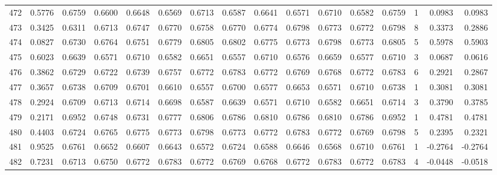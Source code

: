 \begin{tabular}{lrrrrrrrrrrrrrrr}
472 &      0.5776 &  0.6759 &  0.6600 &  0.6648 &  0.6569 &  0.6713 &  0.6587 &  0.6641 &  0.6571 &  0.6710 &   0.6582 &     0.6759 &      1 &                    0.0983 &                     0.0983 \\
473 &      0.3425 &  0.6311 &  0.6713 &  0.6747 &  0.6770 &  0.6758 &  0.6770 &  0.6774 &  0.6798 &  0.6773 &   0.6772 &     0.6798 &      8 &                    0.3373 &                     0.2886 \\
474 &      0.0827 &  0.6730 &  0.6764 &  0.6751 &  0.6779 &  0.6805 &  0.6802 &  0.6775 &  0.6773 &  0.6798 &   0.6773 &     0.6805 &      5 &                    0.5978 &                     0.5903 \\
475 &      0.6023 &  0.6639 &  0.6571 &  0.6710 &  0.6582 &  0.6651 &  0.6557 &  0.6710 &  0.6576 &  0.6659 &   0.6577 &     0.6710 &      3 &                    0.0687 &                     0.0616 \\
476 &      0.3862 &  0.6729 &  0.6722 &  0.6739 &  0.6757 &  0.6772 &  0.6783 &  0.6772 &  0.6769 &  0.6768 &   0.6772 &     0.6783 &      6 &                    0.2921 &                     0.2867 \\
477 &      0.3657 &  0.6738 &  0.6709 &  0.6701 &  0.6610 &  0.6557 &  0.6700 &  0.6577 &  0.6653 &  0.6571 &   0.6710 &     0.6738 &      1 &                    0.3081 &                     0.3081 \\
478 &      0.2924 &  0.6709 &  0.6713 &  0.6714 &  0.6698 &  0.6587 &  0.6639 &  0.6571 &  0.6710 &  0.6582 &   0.6651 &     0.6714 &      3 &                    0.3790 &                     0.3785 \\
479 &      0.2171 &  0.6952 &  0.6748 &  0.6731 &  0.6777 &  0.6806 &  0.6786 &  0.6810 &  0.6786 &  0.6810 &   0.6786 &     0.6952 &      1 &                    0.4781 &                     0.4781 \\
480 &      0.4403 &  0.6724 &  0.6765 &  0.6775 &  0.6773 &  0.6798 &  0.6773 &  0.6772 &  0.6783 &  0.6772 &   0.6769 &     0.6798 &      5 &                    0.2395 &                     0.2321 \\
481 &      0.9525 &  0.6761 &  0.6652 &  0.6607 &  0.6643 &  0.6572 &  0.6724 &  0.6588 &  0.6646 &  0.6568 &   0.6710 &     0.6761 &      1 &                   -0.2764 &                    -0.2764 \\
482 &      0.7231 &  0.6713 &  0.6750 &  0.6772 &  0.6783 &  0.6772 &  0.6769 &  0.6768 &  0.6772 &  0.6783 &   0.6772 &     0.6783 &      4 &                   -0.0448 &                    -0.0518 \\

\end{tabular}
